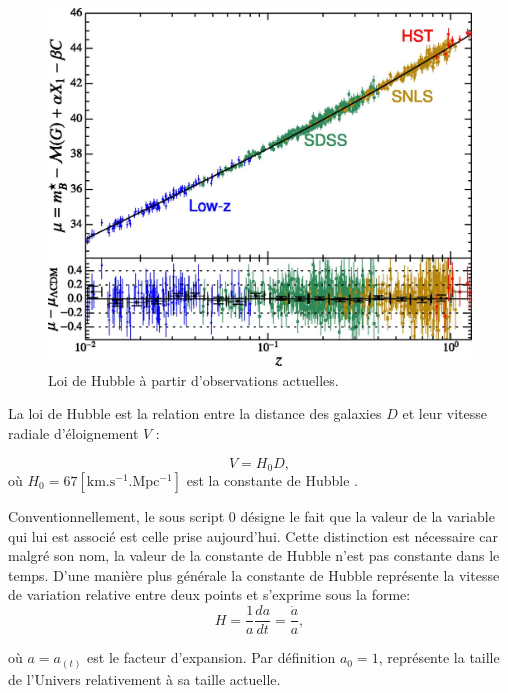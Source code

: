 \begin{figure}[bth]
        \includegraphics[width=.9\linewidth]{img/01/hubble_law.jpg} 
        \caption{Loi de Hubble à partir d'observations actuelles. 
        }
 		\label{fig:hubble_law}
\end{figure}

La loi de Hubble est la relation entre la distance des galaxies $D$ et leur vitesse radiale d'éloignement $V$ : %

\begin{equation}
V = H_0 D,
\end{equation}
où $H_0 = 67 \mathrm{ \left[ km.s^{-1}.Mpc^{-1} \right ] }$ est la constante de Hubble \citep{planck_collaboration_planck_2016}.

Conventionnellement, le sous script $0$ désigne le fait que la valeur de la variable qui lui est associé est celle prise aujourd'hui.
Cette distinction est nécessaire car malgré son nom, la valeur de la constante de Hubble n'est pas constante dans le temps.
D'une manière plus générale la constante de Hubble représente la vitesse de variation relative entre deux points et s'exprime sous la forme:
\begin{equation}
H=\frac{1}{a} \frac{da}{dt} = \frac{\dot{a}}{a},
\end{equation}

où $a = a_{(t)}$ est le facteur d'expansion.
Par définition $a_0 = 1$,  représente la taille de l'Univers relativement à sa taille actuelle.

